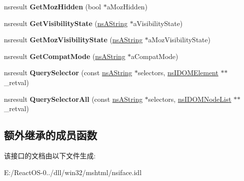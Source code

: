 \begin{DoxyCompactItemize}
nsresult {\bfseries Get\+Moz\+Hidden} (bool $\ast$a\+Moz\+Hidden)
\item 
\mbox{\label{interfacens_i_d_o_m_document_a9ff85c598a08e9062c926ac3ad0ee802}} 
nsresult {\bfseries Get\+Visibility\+State} (\hyperlink{structns_string_container}{ns\+A\+String} $\ast$a\+Visibility\+State)
\item 
\mbox{\label{interfacens_i_d_o_m_document_a5f07702262c5015b4dde46ab559fb097}} 
nsresult {\bfseries Get\+Moz\+Visibility\+State} (\hyperlink{structns_string_container}{ns\+A\+String} $\ast$a\+Moz\+Visibility\+State)
\item 
\mbox{\label{interfacens_i_d_o_m_document_a155d215b5f33f52a57820ed8b531b6ed}} 
nsresult {\bfseries Get\+Compat\+Mode} (\hyperlink{structns_string_container}{ns\+A\+String} $\ast$a\+Compat\+Mode)
\item 
\mbox{\label{interfacens_i_d_o_m_document_ae3f708eda12d7276bd15063aa8a31ed0}} 
nsresult {\bfseries Query\+Selector} (const \hyperlink{structns_string_container}{ns\+A\+String} $\ast$selectors, \hyperlink{interfacens_i_d_o_m_element}{ns\+I\+D\+O\+M\+Element} $\ast$$\ast$\+\_\+retval)
\item 
\mbox{\label{interfacens_i_d_o_m_document_abd96bff1c753ef36631d6c9b90eb9f3b}} 
nsresult {\bfseries Query\+Selector\+All} (const \hyperlink{structns_string_container}{ns\+A\+String} $\ast$selectors, \hyperlink{interfacens_i_d_o_m_node_list}{ns\+I\+D\+O\+M\+Node\+List} $\ast$$\ast$\+\_\+retval)
\end{DoxyCompactItemize}
\subsection*{额外继承的成员函数}


该接口的文档由以下文件生成\+:\begin{DoxyCompactItemize}
\item 
E\+:/\+React\+O\+S-\/0../dll/win32/mshtml/nsiface.\+idl\end{DoxyCompactItemize}
